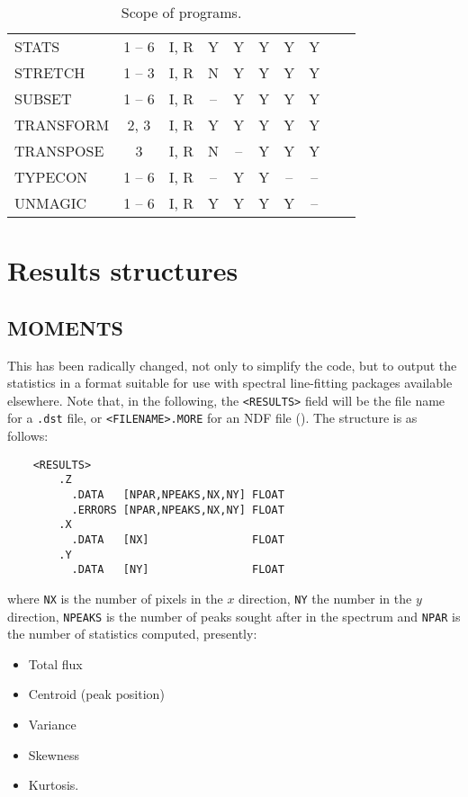 {\begin{table}[ht]
\begin{center}
\begin{tabular}{|l|c|c|c|c|c|c|c|c|c|}
STATS     & 1 -- 6 & I, R & Y & Y & Y & Y & Y\\
STRETCH   & 1 -- 3 & I, R & N & Y & Y & Y & Y\\
SUBSET    & 1 -- 6 & I, R & -- & Y & Y & Y & Y\\
TRANSFORM & 2, 3   & I, R & Y & Y & Y & Y & Y\\
TRANSPOSE & 3      & I, R & N & -- & Y & Y & Y\\
TYPECON   & 1 -- 6 & I, R & -- & Y & Y & -- & --\\
UNMAGIC   & 1 -- 6 & I, R & Y & Y & Y & Y & --\\
\hline
\end{tabular}
\end{center}
\caption{Scope of programs.}
\end{table}
}

\clearpage

\section{Results structures{}}
\label{sec:results}

\subsection{MOMENTS}

This has been radically changed, not only to simplify the code, but to output
the statistics in a format suitable for use with spectral line-fitting packages
available elsewhere. Note that, in the following,
the {\tt <RESULTS>} field will be the file name for a {\tt .dst} file, or
{\tt <FILENAME>.MORE} for an NDF file ().
The structure is as follows:

\begin{myquote}
\begin{verbatim}
    <RESULTS>
        .Z
          .DATA   [NPAR,NPEAKS,NX,NY] FLOAT
          .ERRORS [NPAR,NPEAKS,NX,NY] FLOAT
        .X
          .DATA   [NX]                FLOAT
        .Y
          .DATA   [NY]                FLOAT
\end{verbatim}
\end{myquote}

where {\tt NX} is the number of pixels in the $x$ direction, {\tt NY} the
number in the $y$ direction, {\tt NPEAKS} is the number of peaks sought
after in the spectrum and {\tt NPAR} is the number of statistics computed,
presently:
\begin{itemize}
\item Total flux
\item Centroid (peak position)
\item Variance
\item Skewness
\item Kurtosis.
\end{itemize}

